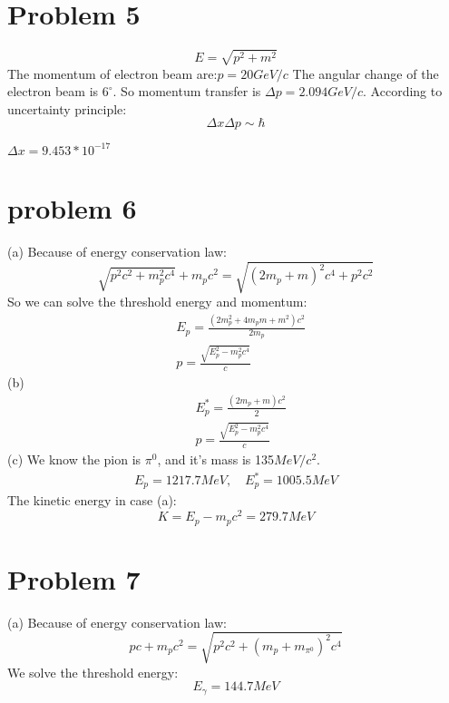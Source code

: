 \documentclass{article}
\begin{document}
\begin{CJK*}{GBK}{song}
\section{Problem 5}
\begin{equation}
E=\sqrt{p^2+m^2}
\end{equation}
The momentum of electron beam are:$p=20GeV/c$
The angular change of the electron beam is $6^{\circ}$. So momentum transfer is $\Delta p= 2.094GeV/c$.
According to uncertainty principle:
\begin{equation}
\Delta x\Delta p\sim \hbar 
\end{equation}
\begin{center}
$
\Delta x=9.453*10^{-17}
$
\end{center}

\section{problem 6}
(a)  
Because of energy conservation law:
\begin{equation}
\sqrt{p^2c^2+m^2_pc^4}+m_pc^2=\sqrt{(2m_p+m)^2c^4+p^2c^2}
\end{equation}
So we can solve the threshold energy and momentum:
\begin{equation}
\begin{aligned}
&E_p=\frac{(2m_p^2+4m_pm+m^2)c^2}{2m_p}\\
&p=\frac{\sqrt{E_p^2-m_p^2c^4}}{c}
\end{aligned}
\end{equation}
(b)
\begin{equation}
\begin{aligned}
&E^*_p=\frac{(2m_p+m)c^2}{2}\\
&p=\frac{\sqrt{E_p^2-m_p^2c^4}}{c}
\end{aligned}
\end{equation}
(c) We know the pion is $\pi^0$, and it's mass is 135$MeV/c^2$.
\begin{equation}
\begin{aligned}
E_p=1217.7MeV,\quad E^*_p=1005.5MeV
\end{aligned}
\end{equation}
The kinetic energy in case (a):
\begin{equation}
K=E_p-m_pc^2=279.7MeV
\end{equation}

\section{Problem 7}
(a) Because of energy conservation law:
\begin{equation}
pc+m_pc^2=\sqrt{p^2c^2+(m_p+m_{\pi^0})^2c^4}
\end{equation}
We solve the threshold energy:
\begin{equation}
E_{\gamma}=144.7MeV
\end{equation}


\end{CJK*}
\end{document}
